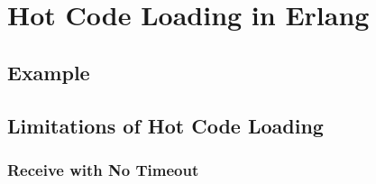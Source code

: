 \chapter{Hot Code Loading in Erlang}

\section{Example}



\section{Limitations of Hot Code Loading}

\subsection{Receive with No Timeout}
